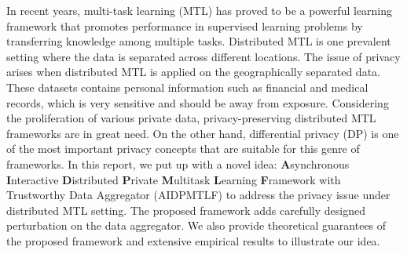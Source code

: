 
In recent years, multi-task learning (MTL) has proved to be a powerful learning framework that promotes performance in supervised learning problems by transferring knowledge among multiple tasks. Distributed MTL is one prevalent setting where the data is separated across different locations. The issue of privacy arises when distributed MTL is applied on the geographically separated data. These datasets contains personal information such as financial and medical records, which is very sensitive and should be away from exposure. Considering the proliferation of various private data, privacy-preserving distributed MTL frameworks are in great need. On the other hand, differential privacy (DP) is one of the most important privacy concepts that are suitable for this genre of frameworks. In this report, we put up with a novel idea: \textbf{A}synchronous \textbf{I}nteractive \textbf{D}istributed \textbf{P}rivate \textbf{M}ultitask \textbf{L}earning \textbf{F}ramework with Trustworthy Data Aggregator (AIDPMTLF) to address the privacy issue under distributed MTL setting. The proposed framework adds carefully designed perturbation on the data aggregator. We also provide theoretical guarantees of the proposed framework and extensive empirical results to illustrate our idea. 